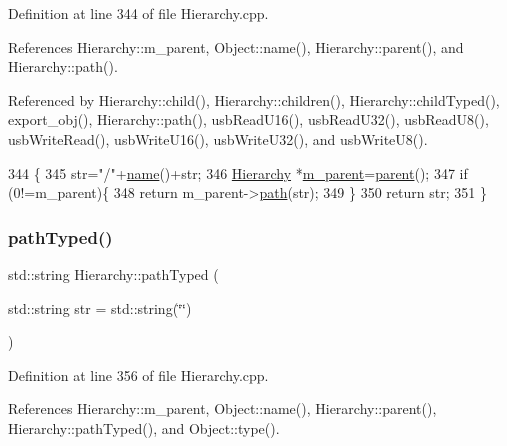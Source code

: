 Definition at line 344 of file Hierarchy.\+cpp.



References Hierarchy\+::m\+\_\+parent, Object\+::name(), Hierarchy\+::parent(), and Hierarchy\+::path().



Referenced by Hierarchy\+::child(), Hierarchy\+::children(), Hierarchy\+::child\+Typed(), export\+\_\+obj(), Hierarchy\+::path(), usb\+Read\+U16(), usb\+Read\+U32(), usb\+Read\+U8(), usb\+Write\+Read(), usb\+Write\+U16(), usb\+Write\+U32(), and usb\+Write\+U8().


\begin{DoxyCode}
344                                       \{
345   str=\textcolor{stringliteral}{"/"}+\hyperlink{classObject_a300f4c05dd468c7bb8b3c968868443c1}{name}()+str;
346   \hyperlink{classHierarchy}{Hierarchy} *\hyperlink{classHierarchy_a5814bb280d4e8539ab25ab6cbfb9cc4f}{m\_parent}=\hyperlink{classHierarchy_a1c7bec8257e717f9c1465e06ebf845fc}{parent}();
347   \textcolor{keywordflow}{if} (0!=m\_parent)\{
348     \textcolor{keywordflow}{return} m\_parent->\hyperlink{classHierarchy_aa7990fa7caf132d83e361ce033c6c65a}{path}(str);
349   \}
350   \textcolor{keywordflow}{return} str;
351 \}
\end{DoxyCode}
\mbox{\label{classHierarchy_a1efd56cd164d328d2002e53a10a19b8c}} 
\subsubsection{\texorpdfstring{path\+Typed()}{pathTyped()}}
{\footnotesize\ttfamily std\+::string Hierarchy\+::path\+Typed (\begin{DoxyParamCaption}\item[{std\+::string}]{str = {\ttfamily std\+:\+:string(\char`\"{}\char`\"{})} }\end{DoxyParamCaption})\hspace{0.3cm}{\ttfamily [inherited]}}



Definition at line 356 of file Hierarchy.\+cpp.



References Hierarchy\+::m\+\_\+parent, Object\+::name(), Hierarchy\+::parent(), Hierarchy\+::path\+Typed(), and Object\+::type().



